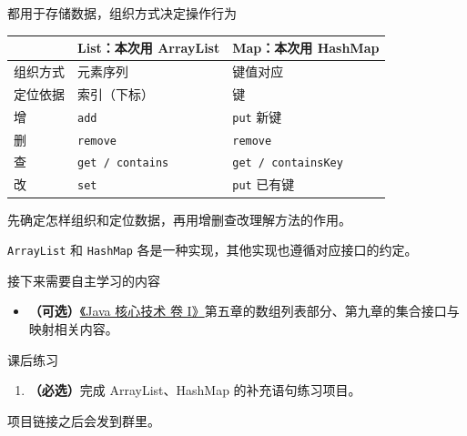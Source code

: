 \documentclass[aspectratio=169]{beamer}
\begin{document}
\begin{frame}{都用于存储数据，组织方式决定操作行为}
  \begin{center}
    \renewcommand{\arraystretch}{1.35}
    \begin{tabular}{lll}
      & \textbf{List：本次用 ArrayList} & \textbf{Map：本次用 HashMap} \\
      \hline
      组织方式 & 元素序列 & 键值对应 \\
      定位依据 & 索引（下标） & 键 \\
      增 & \texttt{add} & \texttt{put} 新键 \\
      删 & \texttt{remove} & \texttt{remove} \\
      查 & \texttt{get / contains} & \texttt{get / containsKey} \\
      改 & \texttt{set} & \texttt{put} 已有键 \\
    \end{tabular}
  \end{center}
  \bigskip
  先确定\alert{怎样组织和定位数据}，再用\alert{增删查改}理解方法的作用。
  \par\medskip
  \texttt{ArrayList} 和 \texttt{HashMap} 各是一种实现，其他实现也遵循对应接口的约定。
\end{frame}

\begin{frame}{接下来需要自主学习的内容}
  \begin{itemize}
    \item \textbf{（可选）}\href{https://www.informit.com/store/core-java-volumei-fundamentals-9780135558607}{《Java 核心技术 卷 I》}第五章的数组列表部分、第九章的集合接口与映射相关内容。
  \end{itemize}
\end{frame}

\begin{frame}{课后练习}
  \begin{enumerate}
    \item \textbf{（必选）}完成 ArrayList、HashMap 的补充语句练习项目。
  \end{enumerate}
  \bigskip
  项目链接之后会发到群里。
\end{frame}
\end{document}
